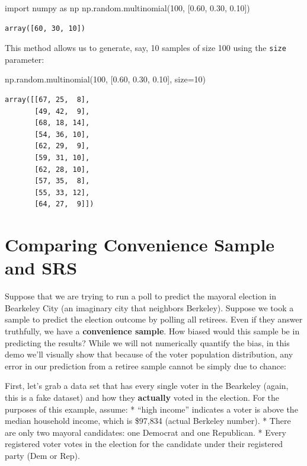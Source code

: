 \documentclass[
  letterpaper,
  DIV=11,
  numbers=noendperiod]{scrreprt}
\newenvironment{Shaded}{\begin{snugshade}}{\end{snugshade}}
\newcommand{\DecValTok}[1]{\textcolor[rgb]{0.68,0.00,0.00}{#1}}
\newcommand{\FloatTok}[1]{\textcolor[rgb]{0.68,0.00,0.00}{#1}}
\newcommand{\ImportTok}[1]{\textcolor[rgb]{0.00,0.46,0.62}{#1}}
\newcommand{\NormalTok}[1]{\textcolor[rgb]{0.00,0.23,0.31}{#1}}
\newcommand{\OperatorTok}[1]{\textcolor[rgb]{0.37,0.37,0.37}{#1}}
\begin{document}
\begin{Shaded}
\begin{Highlighting}[]
\ImportTok{import}\NormalTok{ numpy }\ImportTok{as}\NormalTok{ np}
\NormalTok{np.random.multinomial(}\DecValTok{100}\NormalTok{, [}\FloatTok{0.60}\NormalTok{, }\FloatTok{0.30}\NormalTok{, }\FloatTok{0.10}\NormalTok{])}
\end{Highlighting}
\end{Shaded}

\begin{verbatim}
array([60, 30, 10])
\end{verbatim}

This method allows us to generate, say, 10 samples of size 100 using the
\texttt{size} parameter:

\begin{Shaded}
\begin{Highlighting}[]
\NormalTok{np.random.multinomial(}\DecValTok{100}\NormalTok{, [}\FloatTok{0.60}\NormalTok{, }\FloatTok{0.30}\NormalTok{, }\FloatTok{0.10}\NormalTok{], size}\OperatorTok{=}\DecValTok{10}\NormalTok{)}
\end{Highlighting}
\end{Shaded}

\begin{verbatim}
array([[67, 25,  8],
       [49, 42,  9],
       [68, 18, 14],
       [54, 36, 10],
       [62, 29,  9],
       [59, 31, 10],
       [62, 28, 10],
       [57, 35,  8],
       [55, 33, 12],
       [64, 27,  9]])
\end{verbatim}

\hypertarget{comparing-convenience-sample-and-srs}{%
\section{Comparing Convenience Sample and
SRS}\label{comparing-convenience-sample-and-srs}}

Suppose that we are trying to run a poll to predict the mayoral election
in Bearkeley City (an imaginary city that neighbors Berkeley). Suppose
we took a sample to predict the election outcome by polling all
retirees. Even if they answer truthfully, we have a \textbf{convenience
sample}. How biased would this sample be in predicting the results?
While we will not numerically quantify the bias, in this demo we'll
visually show that because of the voter population distribution, any
error in our prediction from a retiree sample cannot be simply due to
chance:

First, let's grab a data set that has every single voter in the
Bearkeley (again, this is a fake dataset) and how they \textbf{actually}
voted in the election. For the purposes of this example, assume: *
``high income'' indicates a voter is above the median household income,
which is \$97,834 (actual Berkeley number). * There are only two mayoral
candidates: one Democrat and one Republican. * Every registered voter
votes in the election for the candidate under their registered party
(Dem or Rep).
\end{document}
